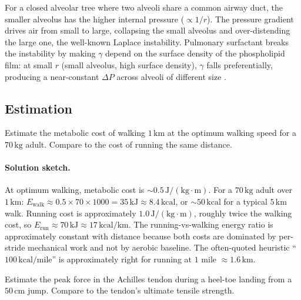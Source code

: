For a closed alveolar tree where two alveoli share a common airway
duct, the smaller alveolus has the higher internal pressure
($\propto 1/r$). The pressure gradient drives air from small to
large, collapsing the small alveolus and over-distending the large
one, the well-known Laplace instability. Pulmonary surfactant
breaks the instability by making $\gamma$ depend on the surface
density of the phospholipid film: at small $r$ (small alveolus,
high surface density), $\gamma$ falls preferentially, producing a
near-constant $\Delta P$ across alveoli of different size
\cite[p.~171]{paper:v6c06-clements-1957}.

\subsection*{Estimation}

\begin{exercise}
Estimate the metabolic cost of walking $1\,\text{km}$ at the optimum
walking speed for a $70\,\text{kg}$ adult. Compare to the cost of
running the same distance.
\end{exercise}

\paragraph{Solution sketch.}
At optimum walking, metabolic cost is $\sim 0.5\,\text{J}/(\text{kg}\cdot\text{m})$.
For a $70\,\text{kg}$ adult over $1\,\text{km}$:
$E_{\text{walk}} \approx 0.5 \times 70 \times 1000 = 35\,\text{kJ}
\approx 8.4\,\text{kcal}$, or $\sim 50\,\text{kcal}$ for a typical
$5\,\text{km}$ walk. Running cost is approximately
$1.0\,\text{J}/(\text{kg}\cdot\text{m})$, roughly twice the walking
cost, so $E_{\text{run}} \approx 70\,\text{kJ} \approx
17\,\text{kcal}/\text{km}$. The running-vs-walking energy ratio is
approximately constant with distance because both costs are
dominated by per-stride mechanical work and not by aerobic baseline.
The often-quoted heuristic ``$100\,\text{kcal/mile}$'' is
approximately right for running at $1$ mile $\approx 1.6\,\text{km}$.

\begin{exercise}
Estimate the peak force in the Achilles tendon during a heel-toe
landing from a $50\,\text{cm}$ jump. Compare to the tendon's
ultimate tensile strength.
\end{exercise}

